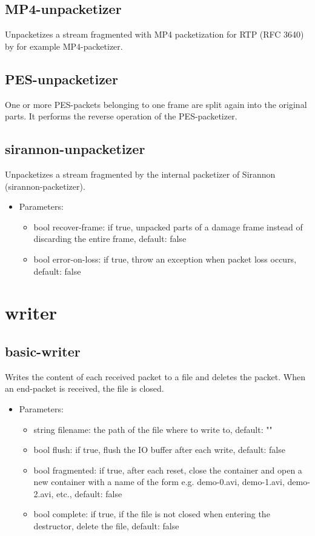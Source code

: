 \subsection{MP4-unpacketizer}
Unpacketizes a stream fragmented with MP4 packetization for RTP (RFC 3640) by for example MP4-packetizer.
\subsection{PES-unpacketizer}
One or more PES-packets belonging to one frame are split again into the original parts. It performs the reverse operation of the PES-packetizer.
\subsection{sirannon-unpacketizer}
Unpacketizes a stream fragmented by the internal packetizer of Sirannon (sirannon-packetizer).
\begin{itemize}
\item Parameters:
\begin{itemize}
\item bool recover-frame: if true, unpacked parts of a damage frame instead of discarding the entire frame, default: false
\item bool error-on-loss: if true, throw an exception when packet loss occurs, default: false
\end{itemize}
\end{itemize}
\newpage
\section{writer}

\subsection{basic-writer}
Writes the content of each received packet to a file and deletes the packet. When an end-packet is received, the file is closed.
\begin{itemize}
\item Parameters:
\begin{itemize}
\item string filename: the path of the file where to write to, default: ""
\item bool flush: if true, flush the IO buffer after each write, default: false
\item bool fragmented: if true, after each reset, close the container and open a new container with a name of the form e.g. demo-0.avi, demo-1.avi, demo-2.avi, etc., default: false
\item bool complete: if true, if the file is not closed when entering the destructor, delete the file, default: false
\end{itemize}
\end{itemize}
